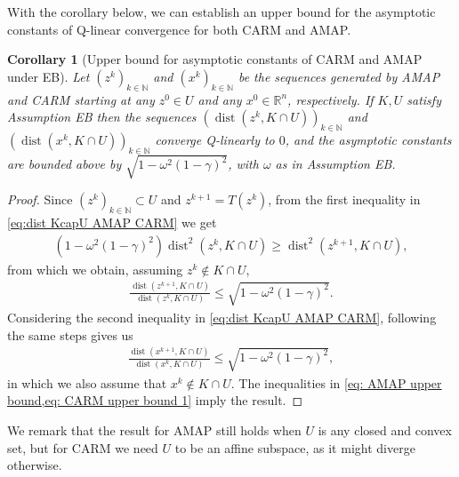 \documentclass[smallextended,numbook,nospthms]{svjour3}
\theoremstyle{plain}
\newtheorem{corollary}[theorem]{Corollary}
\theoremstyle{definition}
\def\RR{\mathds R}
\def\NN{\mathds N}
\DeclareMathOperator{\dist}{dist}
\begin{document}
With the corollary below, we can establish an upper bound for the asymptotic constants of Q-linear convergence for both CARM and AMAP.
\begin{corollary}[Upper bound for asymptotic constants of CARM and AMAP under EB]\label{prop:EB Q conv}
	Let $\left(z^{k}\right)_{k \in \NN}$ and $\left(x^{k}\right)_{k \in \NN}$ be the sequences generated by AMAP and CARM starting at any $z^{0} \in U$ and any $x^{0} \in \RR^{n}$, respectively. If $K, U$ satisfy Assumption EB then the sequences $\left(\dist\left(z^{k}, K \cap U\right)\right)_{k \in \NN}$ and $\left(\dist\left(x^{k}, K \cap U\right)\right)_{k \in \NN}$ converge Q-linearly to $0$, and the asymptotic constants are bounded above by $\sqrt{1-\omega^{2}(1-\gamma)^{2}}$, with $\omega$ as in Assumption EB.
\end{corollary}
\begin{proof}
    Since $\left(z^{k}\right)_{k \in \NN} \subset U$ and $z^{k+1}=T\left(z^{k}\right)$, from the first inequality in \cref{eq:dist KcapU AMAP CARM} we get
	\begin{align}
		\left(1-\omega^{2}(1-\gamma)^{2}\right) \dist^{2}\left(z^{k}, K \cap U\right) \geq \dist^{2}\left(z^{k+1}, K \cap U\right),
	\end{align}
    from which we obtain, assuming $z^k \notin K \cap U$,
	\begin{align}\label{eq: AMAP upper bound}
		\frac{\dist\left(z^{k+1}, K \cap U\right)}{\dist\left(z^{k}, K \cap U\right)} \leq \sqrt{1-\omega^{2}(1-\gamma)^{2}}.
	\end{align}
	Considering the second inequality in \cref{eq:dist KcapU AMAP CARM}, following the same steps gives us
	\begin{align}\label{eq: CARM upper bound 1}
		\frac{\dist\left(x^{k+1}, K \cap U\right)}{\dist\left(x^{k}, K \cap U\right)} \leq \sqrt{1-\omega^{2}(1-\gamma)^{2}},
	\end{align}
	in which we also assume that $x^k \notin K\cap U$.
	The inequalities in \cref{eq: AMAP upper bound,eq: CARM upper bound 1} imply the result.
\end{proof}
We remark that the result for AMAP still holds when $U$ is any closed and convex set, but for  CARM we need $U$ to be an affine subspace, as it might diverge otherwise.
\end{document}
